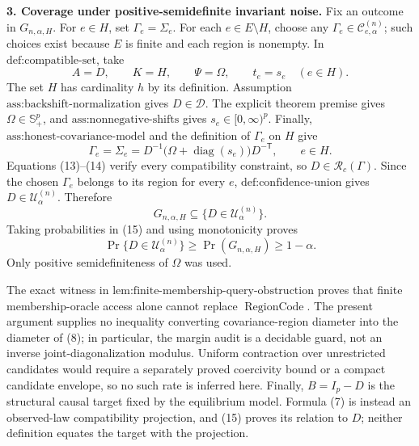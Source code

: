 \textbf{3. Coverage under positive-semidefinite invariant noise.}
Fix an outcome in \(G_{n,\alpha,H}\).  For \(e\in H\), set \(\Gamma_e=\Sigma_e\).  For each \(e\in E\setminus H\), choose any \(\Gamma_e\in\mathcal C^{(n)}_{e,\alpha}\); such choices exist because \(E\) is finite and each region is nonempty.  In \(\text{def:compatible-set}\), take
\[
 A=D,
 \qquad K=H,
 \qquad \Psi=\Omega,
 \qquad t_e=s_e\quad(e\in H).
\tag{13}
\]
The set \(H\) has cardinality \(h\) by its definition.  Assumption \(\text{ass:backshift-normalization}\) gives \(D\in\mathcal D\).  The explicit theorem premise gives \(\Omega\in\mathbb S_+^p\), and \(\text{ass:nonnegative-shifts}\) gives \(s_e\in[0,\infty)^p\).  Finally, \(\text{ass:honest-covariance-model}\) and the definition of \(\Gamma_e\) on \(H\) give
\[
 \Gamma_e=\Sigma_e
 =D^{-1}\bigl(\Omega+\operatorname{diag}(s_e)\bigr)D^{-\mathsf T},
 \qquad e\in H.
\tag{14}
\]
Equations (13)--(14) verify every compatibility constraint, so \(D\in\mathcal R_c(\Gamma)\).  Since the chosen \(\Gamma_e\) belongs to its region for every \(e\), \(\text{def:confidence-union}\) gives \(D\in\mathcal U^{(n)}_\alpha\).  Therefore
\[
 G_{n,\alpha,H}\subseteq\{D\in\mathcal U^{(n)}_\alpha\}.
\tag{15}
\]
Taking probabilities in (15) and using monotonicity proves
\[
 \Pr\{D\in\mathcal U^{(n)}_\alpha\}
 \geq\Pr(G_{n,\alpha,H})\geq1-\alpha.
\]
Only positive semidefiniteness of \(\Omega\) was used.

The exact witness in \(\text{lem:finite-membership-query-obstruction}\) proves that finite membership-oracle access alone cannot replace \(\operatorname{RegionCode}\).  The present argument supplies no inequality converting covariance-region diameter into the diameter of (8); in particular, the margin audit is a decidable guard, not an inverse joint-diagonalization modulus.  Uniform contraction over unrestricted candidates would require a separately proved coercivity bound or a compact candidate envelope, so no such rate is inferred here.  Finally, \(B=I_p-D\) is the structural causal target fixed by the equilibrium model.  Formula (7) is instead an observed-law compatibility projection, and (15) proves its relation to \(D\); neither definition equates the target with the projection.
